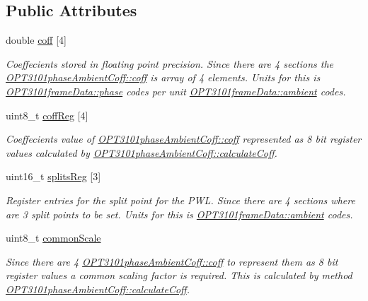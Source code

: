 \subsection*{Public Attributes}
\begin{DoxyCompactItemize}
\item 
double \mbox{\hyperlink{class_o_p_t3101phase_ambient_coff_a0174483b15a3819cf8b30fcad00f7dda}{coff}} \mbox{[}4\mbox{]}
\begin{DoxyCompactList}\small\item\em Coeffecients stored in floating point precision. Since there are 4 sections the \mbox{\hyperlink{class_o_p_t3101phase_ambient_coff_a0174483b15a3819cf8b30fcad00f7dda}{O\+P\+T3101phase\+Ambient\+Coff\+::coff}} is array of 4 elements. Units for this is \mbox{\hyperlink{class_o_p_t3101frame_data_a4d07c723715856ea9652b3d672d01191}{O\+P\+T3101frame\+Data\+::phase}} codes per unit \mbox{\hyperlink{class_o_p_t3101frame_data_a901d8630d15b79b558e7d7c5a9d08cc7}{O\+P\+T3101frame\+Data\+::ambient}} codes. \end{DoxyCompactList}\item 
uint8\+\_\+t \mbox{\hyperlink{class_o_p_t3101phase_ambient_coff_a7b9be6815f936c44329b53f5f57b3d6c}{coff\+Reg}} \mbox{[}4\mbox{]}
\begin{DoxyCompactList}\small\item\em Coeffecients value of \mbox{\hyperlink{class_o_p_t3101phase_ambient_coff_a0174483b15a3819cf8b30fcad00f7dda}{O\+P\+T3101phase\+Ambient\+Coff\+::coff}} represented as 8 bit register values calculated by \mbox{\hyperlink{class_o_p_t3101phase_ambient_coff_a926e3a0dcadac3172c34982bbf8e1bbe}{O\+P\+T3101phase\+Ambient\+Coff\+::calculate\+Coff}}. \end{DoxyCompactList}\item 
uint16\+\_\+t \mbox{\hyperlink{class_o_p_t3101phase_ambient_coff_ae784da8b9f3bf0af13e2ebaff6c980fb}{splits\+Reg}} \mbox{[}3\mbox{]}
\begin{DoxyCompactList}\small\item\em Register entries for the split point for the P\+WL. Since there are 4 sections where are 3 split points to be set. Units for this is \mbox{\hyperlink{class_o_p_t3101frame_data_a901d8630d15b79b558e7d7c5a9d08cc7}{O\+P\+T3101frame\+Data\+::ambient}} codes. \end{DoxyCompactList}\item 
uint8\+\_\+t \mbox{\hyperlink{class_o_p_t3101phase_ambient_coff_ac2976af69df6837bd7bc1881b87f7188}{common\+Scale}}
\begin{DoxyCompactList}\small\item\em Since there are 4 \mbox{\hyperlink{class_o_p_t3101phase_ambient_coff_a0174483b15a3819cf8b30fcad00f7dda}{O\+P\+T3101phase\+Ambient\+Coff\+::coff}} to represent them as 8 bit register values a common scaling factor is required. This is calculated by method \mbox{\hyperlink{class_o_p_t3101phase_ambient_coff_a926e3a0dcadac3172c34982bbf8e1bbe}{O\+P\+T3101phase\+Ambient\+Coff\+::calculate\+Coff}}. \end{DoxyCompactList}\end{DoxyCompactItemize}


